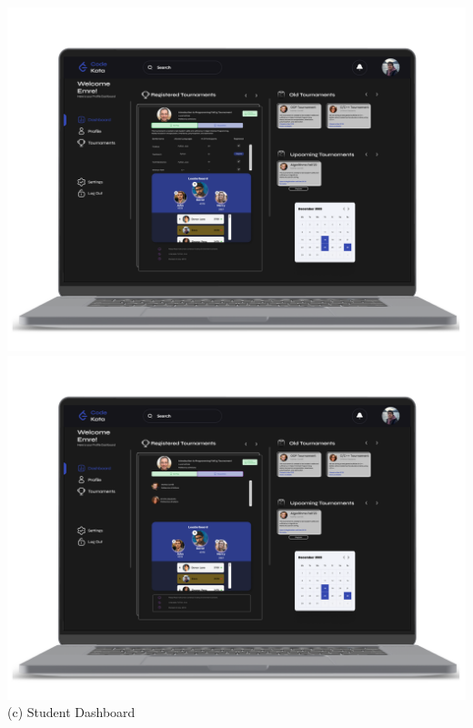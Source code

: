 \begin{center}
    \includegraphics[scale=0.13]{Images/ui-ux/student_dashboard/student_dashboard_1.png}
    \includegraphics[scale=0.13]{Images/ui-ux/student_dashboard/student_dashboard_2.png}
            (c) Student Dashboard
\end{center}
